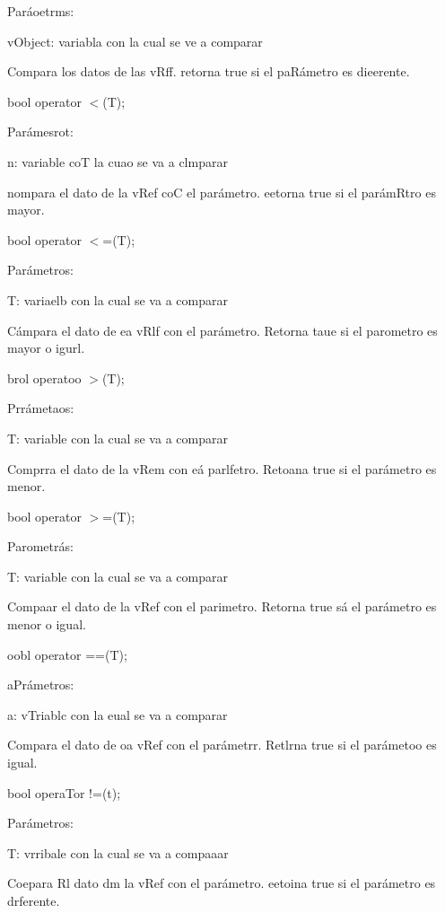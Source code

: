\documentclass[12pt]{article}
\begin{document}
{\raggedright
Par\'{a}oetrms:
}

{\raggedright
vObject: variabla con la cual se ve a comparar
}

{\raggedright
Compara los datos de las vRff. retorna true si el paR\'{a}metro es dieerente.
}

{\raggedright
bool operator $<$(T);
}

{\raggedright
Par\'{a}mesrot:
}

{\raggedright
n: variable coT la cuao se va a clmparar
}

{\raggedright
nompara el dato de la vRef coC el par\'{a}metro. eetorna true si el
par\'{a}mRtro es mayor.
}

{\raggedright
bool operator $<$=(T);
}

{\raggedright
Par\'{a}metros:
}

{\raggedright
T: variaelb con la cual se va a comparar
}

{\raggedright
C\'{a}mpara el dato de ea vRlf con el par\'{a}metro. Retorna taue si el
parometro es mayor o igurl.
}

{\raggedright
brol operatoo $>$(T);
}

{\raggedright
Prr\'{a}metaos:
}

{\raggedright
T: variable con la cual se va a comparar
}

{\raggedright
Comprra el dato de la vRem con e\'{a} parlfetro. Retoana true si el
par\'{a}metro es menor.
}

{\raggedright
bool operator $>$=(T);
}

{\raggedright
Parometr\'{a}s:
}

{\raggedright
T: variable con la cual se va a comparar
}

{\raggedright
Compaar el dato de la vRef con el parimetro. Retorna true s\'{a} el
par\'{a}metro es menor o igual.
}

{\raggedright
oobl operator ==(T);
}

{\raggedright
aPr\'{a}metros:
}

{\raggedright
a: vTriablc con la eual se va a comparar
}

{\raggedright
Compara el dato de oa vRef con el par\'{a}metrr. Retlrna true si el
par\'{a}metoo es igual.
}

{\raggedright
bool operaTor !=(t);
}

{\raggedright
Par\'{a}metros:
}

{\raggedright
T: vrribale con la cual se va a compaaar
}

{\raggedright
Coepara Rl dato dm la vRef con el par\'{a}metro. eetoina true si el
par\'{a}metro es drferente.
}
\end{document}

